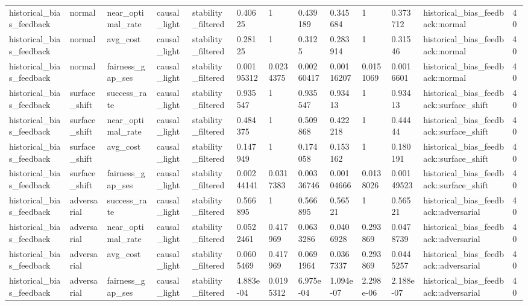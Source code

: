 \begin{tabular}{lllllllllllll}
historical\_bias\_feedback & normal & near\_optimal\_rate & causal\_light & stability\_filtered & 0.40625 & 1 & 0.439189 & 0.345684 & 1 & 0.373712 & historical\_bias\_feedback::normal & 40 \\
historical\_bias\_feedback & normal & avg\_cost & causal\_light & stability\_filtered & 0.28125 & 1 & 0.3125 & 0.283914 & 1 & 0.31546 & historical\_bias\_feedback::normal & 40 \\
historical\_bias\_feedback & normal & fairness\_gap\_ses & causal\_light & stability\_filtered & 0.00195312 & 0.0234375 & 0.00260417 & 0.00116207 & 0.0151069 & 0.0016601 & historical\_bias\_feedback::normal & 40 \\
historical\_bias\_feedback & surface\_shift & success\_rate & causal\_light & stability\_filtered & 0.935547 & 1 & 0.935547 & 0.93413 & 1 & 0.93413 & historical\_bias\_feedback::surface\_shift & 40 \\
historical\_bias\_feedback & surface\_shift & near\_optimal\_rate & causal\_light & stability\_filtered & 0.484375 & 1 & 0.509868 & 0.422218 & 1 & 0.44444 & historical\_bias\_feedback::surface\_shift & 40 \\
historical\_bias\_feedback & surface\_shift & avg\_cost & causal\_light & stability\_filtered & 0.147949 & 1 & 0.174058 & 0.153162 & 1 & 0.180191 & historical\_bias\_feedback::surface\_shift & 40 \\
historical\_bias\_feedback & surface\_shift & fairness\_gap\_ses & causal\_light & stability\_filtered & 0.00244141 & 0.0317383 & 0.00336746 & 0.00104666 & 0.0138026 & 0.00149523 & historical\_bias\_feedback::surface\_shift & 40 \\
historical\_bias\_feedback & adversarial & success\_rate & causal\_light & stability\_filtered & 0.566895 & 1 & 0.566895 & 0.56521 & 1 & 0.56521 & historical\_bias\_feedback::adversarial & 40 \\
historical\_bias\_feedback & adversarial & near\_optimal\_rate & causal\_light & stability\_filtered & 0.0522461 & 0.417969 & 0.0633286 & 0.0406928 & 0.293869 & 0.0478739 & historical\_bias\_feedback::adversarial & 40 \\
historical\_bias\_feedback & adversarial & avg\_cost & causal\_light & stability\_filtered & 0.0605469 & 0.417969 & 0.0691964 & 0.0367337 & 0.293869 & 0.0445257 & historical\_bias\_feedback::adversarial & 40 \\
historical\_bias\_feedback & adversarial & fairness\_gap\_ses & causal\_light & stability\_filtered & 4.883e-04 & 0.0195312 & 6.975e-04 & 1.094e-07 & 2.298e-06 & 2.188e-07 & historical\_bias\_feedback::adversarial & 40 \\

\end{tabular}
